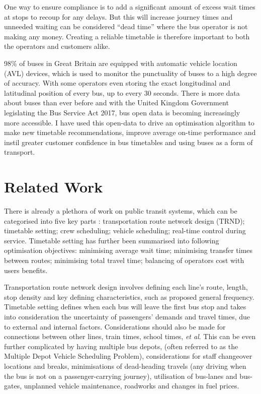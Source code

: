 \documentclass{article}
\begin{document}
\par
 One way to ensure compliance is to add a significant amount of excess wait times at stops to recoup for any delays. But this will increase journey times and unneeded waiting can be considered ``dead time'' where the bus operator is not making any money. Creating a reliable timetable is therefore important to both the operators and customers alike.


\par
98\% of buses in Great Britain are equipped with automatic vehicle location (AVL) devices\cite{RN12}, which is used to monitor the punctuality of buses to a high degree of accuracy. With some operators even storing the exact longitudinal and latitudinal position of every bus, up to every 30 seconds. There is more data about buses than ever before and with the United Kingdom Government legislating the Bus Service Act 2017\cite{RN13}, bus open data is becoming increasingly more accessible. I have used this open-data to drive an optimisation algorithm to make new timetable recommendations, improve average on-time performance and instil greater customer confidence in bus timetables and using buses as a form of transport.



\section{Related Work}
There is already a plethora of work on public transit systems, which can be categorised into five key parts \cite{RN18} \cite{RN20}: transportation route network design (TRND); timetable setting; crew scheduling; vehicle scheduling; real-time control during service. Timetable setting has further been summarised into following optimisation objectives\cite{RN7}: minimising average wait time; minimising transfer times between routes; minimising total travel time; balancing of operators cost with users benefits. 

 \par
Transportation route network design involves defining each line's route, length, stop density and key defining characteristics, such as proposed general frequency. Timetable setting defines when each bus will leave the first bus stop and takes into consideration the uncertainty of passengers' demands and travel times, due to external and internal factors\cite{RN11}. Considerations should also be made for connections between other lines, train times, school times, \textsl{et al}. This can be even further complicated by having multiple bus depots, (often referred to as the Multiple Depot Vehicle Scheduling Problem), considerations for staff changeover locations and breaks, minimisations of dead-heading travels (any driving when the bus is not on a passenger-carrying journey), utilisation of bus-lanes and bus-gates, unplanned vehicle maintenance, roadworks and changes in fuel prices. 
\end{document}
